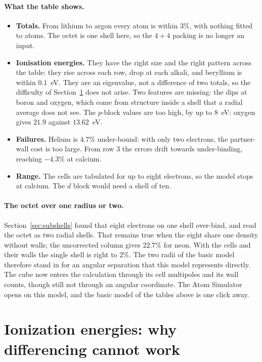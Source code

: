 \paragraph{What the table shows.}
\begin{itemize}
\item \textbf{Totals.} From lithium to argon every atom is within $3\%$, with nothing fitted to atoms. The
octet is one shell here, so the $4{+}4$ packing is no longer an input.
\item \textbf{Ionisation energies.} They have the right size and the right pattern across the table: they rise
across each row, drop at each alkali, and beryllium is within $0.1$~eV. They are an eigenvalue, not a
difference of two totals, so the difficulty of Section~\ref{sec:chi} does not arise. Two features are missing:
the dips at boron and oxygen, which come from structure inside a shell that a radial average does not see.
The $p$-block values are too high, by up to $8$~eV: oxygen gives $21.9$ against $13.62$~eV.
\item \textbf{Failures.} Helium is $4.7\%$ under-bound: with only two electrons, the partner-wall cost is too
large. From row 3 the errors drift towards under-binding, reaching $-4.3\%$ at calcium.
\item \textbf{Range.} The cells are tabulated for up to eight electrons, so the model stops at calcium. The
$d$ block would need a shell of ten.
\end{itemize}

\paragraph{The octet over one radius or two.} Section~\ref{sec:subshells} found that eight electrons on
one shell over-bind, and read the octet as two radial shells. That remains true when the eight share one
density without walls; the uncorrected column gives $22.7\%$ for neon. With the cells and their walls the
single shell is right to $2\%$. The two radii of the basic model therefore stand in for an angular separation
that this model represents directly. The cube now enters the calculation through its cell multipoles and its
wall counts, though still not through an angular coordinate. The Atom Simulator opens on this model, and the
basic model of the tables above is one click away.

\section{Ionization energies: why differencing cannot work}\label{sec:chi}

